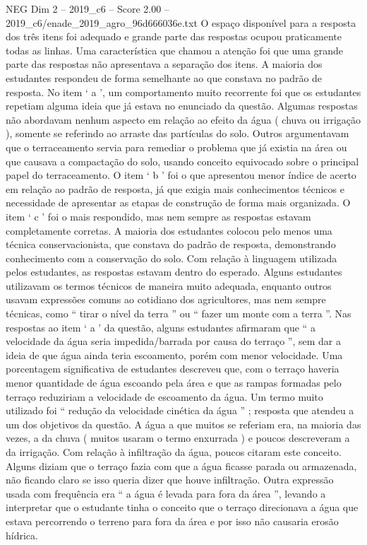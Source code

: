 \begin{textsample}{NEG Dim 2 – 2019\_c6 – Score 2.00 – 2019\_c6/enade\_2019\_agro\_96d666036e.txt}
O espaço disponível para a resposta dos três itens foi adequado e grande parte das respostas ocupou praticamente todas as linhas.
Uma característica que chamou a atenção foi que uma grande parte das respostas não apresentava a separação dos itens.
A maioria dos estudantes respondeu de forma semelhante ao que constava no padrão de resposta.
No item ‘ a ’, um comportamento muito recorrente foi que os estudantes repetiam alguma ideia que já estava no enunciado da questão.
Algumas respostas não abordavam nenhum aspecto em relação ao efeito da água ( chuva ou irrigação ), somente se referindo ao arraste das partículas do solo.
Outros argumentavam que o terraceamento servia para remediar o problema que já existia na área ou que causava a compactação do solo, usando conceito equivocado sobre o principal papel do terraceamento.
O item ‘ b ’ foi o que apresentou menor índice de acerto em relação ao padrão de resposta, já que exigia mais conhecimentos técnicos e necessidade de apresentar as etapas de construção de forma mais organizada.
O item ‘ c ’ foi o mais respondido, mas nem sempre as respostas estavam completamente corretas.
A maioria dos estudantes colocou pelo menos uma técnica conservacionista, que constava do padrão de resposta, demonstrando conhecimento com a conservação do solo.
Com relação à linguagem utilizada pelos estudantes, as respostas estavam dentro do esperado.
Alguns estudantes utilizavam os termos técnicos de maneira muito adequada, enquanto outros usavam expressões comuns ao cotidiano dos agricultores, mas nem sempre técnicas, como “ tirar o nível da terra ” ou “ fazer um monte com a terra ”.
Nas respostas ao item ‘ a ’ da questão, alguns estudantes afirmaram que “ a velocidade da água seria impedida/barrada por causa do terraço ”, sem dar a ideia de que água ainda teria escoamento, porém com menor velocidade.
Uma porcentagem significativa de estudantes descreveu que, com o terraço haveria menor quantidade de água escoando pela área e que as rampas formadas pelo terraço reduziriam a velocidade de escoamento da água.
Um termo muito utilizado foi “ redução da velocidade cinética da água ” ; resposta que atendeu a um dos objetivos da questão.
A água a que muitos se referiam era, na maioria das vezes, a da chuva ( muitos usaram o termo enxurrada ) e poucos descreveram a da irrigação.
Com relação à infiltração da água, poucos citaram este conceito.
Alguns diziam que o terraço fazia com que a água ficasse parada ou armazenada, não ficando claro se isso queria dizer que houve infiltração.
Outra expressão usada com frequência era “ a água é levada para fora da área ”, levando a interpretar que o estudante tinha o conceito que o terraço direcionava a água que estava percorrendo o terreno para fora da área e por isso não causaria erosão hídrica.

\end{textsample}
